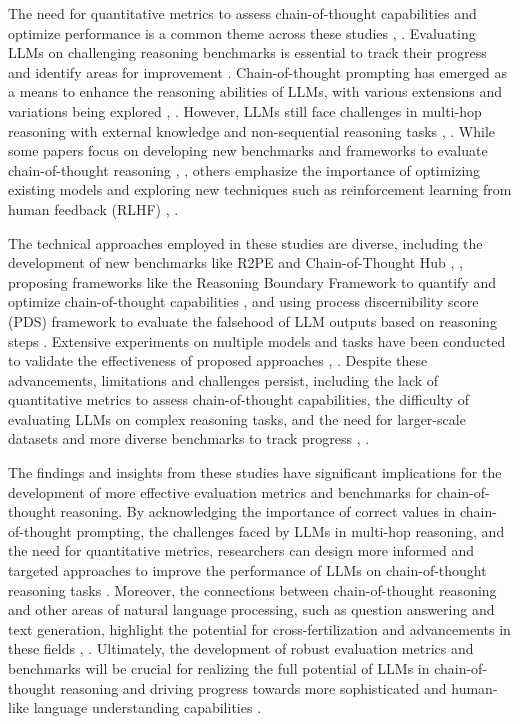 \documentclass[conference]{IEEEtran}
\begin{document}
The need for quantitative metrics to assess chain-of-thought capabilities and optimize performance is a common theme across these studies \cite{b1}, \cite{b8}. Evaluating LLMs on challenging reasoning benchmarks is essential to track their progress and identify areas for improvement \cite{b9}. Chain-of-thought prompting has emerged as a means to enhance the reasoning abilities of LLMs, with various extensions and variations being explored \cite{b10}, \cite{b11}. However, LLMs still face challenges in multi-hop reasoning with external knowledge and non-sequential reasoning tasks \cite{b12}, \cite{b13}. While some papers focus on developing new benchmarks and frameworks to evaluate chain-of-thought reasoning \cite{b2}, \cite{b4}, others emphasize the importance of optimizing existing models and exploring new techniques such as reinforcement learning from human feedback (RLHF) \cite{b14}, \cite{b15}.

The technical approaches employed in these studies are diverse, including the development of new benchmarks like R2PE and Chain-of-Thought Hub \cite{b2}, \cite{b5}, proposing frameworks like the Reasoning Boundary Framework to quantify and optimize chain-of-thought capabilities \cite{b4}, and using process discernibility score (PDS) framework to evaluate the falsehood of LLM outputs based on reasoning steps \cite{b16}. Extensive experiments on multiple models and tasks have been conducted to validate the effectiveness of proposed approaches \cite{b17}, \cite{b18}. Despite these advancements, limitations and challenges persist, including the lack of quantitative metrics to assess chain-of-thought capabilities, the difficulty of evaluating LLMs on complex reasoning tasks, and the need for larger-scale datasets and more diverse benchmarks to track progress \cite{b19}, \cite{b20}.

The findings and insights from these studies have significant implications for the development of more effective evaluation metrics and benchmarks for chain-of-thought reasoning. By acknowledging the importance of correct values in chain-of-thought prompting, the challenges faced by LLMs in multi-hop reasoning, and the need for quantitative metrics, researchers can design more informed and targeted approaches to improve the performance of LLMs on chain-of-thought reasoning tasks \cite{b21}. Moreover, the connections between chain-of-thought reasoning and other areas of natural language processing, such as question answering and text generation, highlight the potential for cross-fertilization and advancements in these fields \cite{b22}, \cite{b23}. Ultimately, the development of robust evaluation metrics and benchmarks will be crucial for realizing the full potential of LLMs in chain-of-thought reasoning and driving progress towards more sophisticated and human-like language understanding capabilities \cite{b24}.
\end{document}
